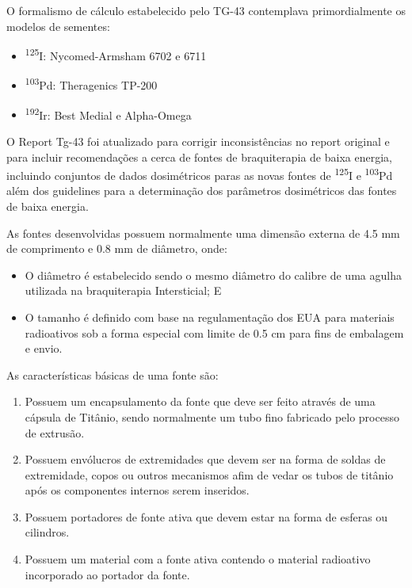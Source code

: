 \documentclass[11pt,a4paper]{article}
\begin{document}
			O formalismo de cálculo estabelecido pelo TG-43 contemplava primordialmente os modelos de sementes:

				\begin{itemize}
					\item \textsuperscript{125}I: Nycomed-Armsham 6702 e 6711
					\item \textsuperscript{103}Pd: Theragenics TP-200
					\item  \textsuperscript{192}Ir: Best Medial e Alpha-Omega
				\end{itemize}
			
			O Report Tg-43 foi atualizado para corrigir inconsistências no report original e para incluir recomendações a cerca de fontes de braquiterapia de baixa energia, incluindo conjuntos de dados dosimétricos paras as novas fontes de \textsuperscript{125}I e \textsuperscript{103}Pd além dos guidelines para a determinação dos parâmetros dosimétricos das fontes de baixa energia.


			As fontes desenvolvidas possuem normalmente uma dimensão externa de 4.5 mm de comprimento e 0.8 mm de diâmetro, onde:

				\begin{itemize}
					\item O diâmetro é estabelecido sendo o mesmo diâmetro do calibre de uma agulha utilizada na braquiterapia Intersticial; E
					\item O tamanho é definido com base na regulamentação dos EUA para materiais radioativos sob a forma especial com limite de 0.5 cm para fins de embalagem e envio.
				\end{itemize}

				As características básicas de uma fonte são:

				\begin{enumerate}
					\item Possuem um encapsulamento da fonte que deve ser feito através de uma cápsula de Titânio, sendo normalmente um tubo fino fabricado pelo processo de extrusão.
					\item Possuem envólucros de extremidades que devem ser na forma de soldas de extremidade, copos ou outros mecanismos afim de vedar os tubos de titânio após os componentes internos serem inseridos.
					\item Possuem portadores de fonte ativa que devem estar na forma de esferas ou cilindros.
					\item Possuem um material com a fonte ativa contendo o material radioativo incorporado ao portador da fonte.
				\end{enumerate}
\end{document}
